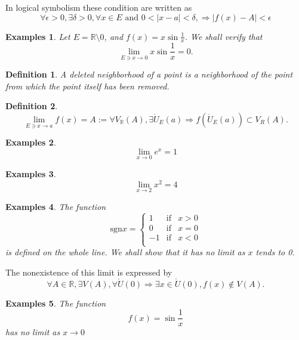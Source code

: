 \documentclass[a4paper,12pt]{article} %
\newtheorem{definition}{Definition}[section]
\newtheorem{example}{Examples}
\begin{document}
In logical symbolism these condition are written as 
\[\forall \epsilon > 0, \exists \delta > 0, \forall x \in E \text{ and } 
0 < |x - a| < \delta, \Rightarrow |f(x) - A| < \epsilon \]

\begin{example}
    Let $E = \mathbb{R} \setminus 0$, and $\displaystyle f(x) = x\sin \frac{1}{x}$. We 
    shall verify that \[ \lim_{E \ni x \to 0} x\sin \frac{1}{x} = 0.\]
\end{example}

\begin{definition}
    A deleted neighborhood of a point is a neighborhood of the point 
    from which the point itself has been removed.
\end{definition}

\begin{definition}
    \[\lim_{E \ni x \to a} f(x) = A := \forall V_{\mathbb{R}}(A), \exists 
    \mathring{U}_E(a) \Rightarrow f\left(\mathring{U}_E(a)\right)
    \subset V_R(A).\]
\end{definition}

\begin{example}
    \[
        \lim_{x \to 0} e^x = 1
        \]
\end{example}
\begin{example}
    \[
        \lim_{x \to 2} x^2 = 4
        \]
\end{example}

\begin{example}
    The function 
    \[
        \mbox{sgn} x = \left\{\begin{array}{rcl} 1 & \mbox{if} & x > 0 \\
                                                0 & \mbox{if} & x = 0 \\
                                               -1 & \mbox{if} & x < 0 \\
                             \end{array} \right.
    \]
is defined on the whole line. We shall show that it has no limit 
as $x$ tends to 0.
\end{example}
The nonexistence of this limit is expressed by 
\[
    \forall A \in \mathbb{R}, \exists V(A), \forall \mathring{U}(0) \Rightarrow 
    \exists x \in \mathring{U}(0), f(x) \notin V(A).
\]

\begin{example}
    The function 
    \[
        f(x) = \sin \frac{1}{x}
    \]
has no limit as $x \to 0$
\end{example}
\end{document}
